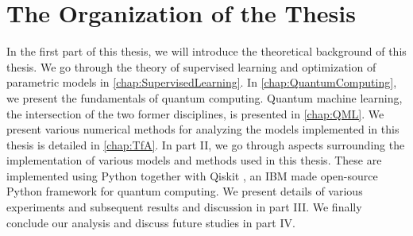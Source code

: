 \section{The Organization of the Thesis}
In the first part of this thesis, we will introduce the theoretical background of this thesis. We go through the theory of supervised learning and optimization of parametric models in \cref{chap:SupervisedLearning}. In \cref{chap:QuantumComputing}, we present the fundamentals of quantum computing. Quantum machine learning, the intersection of the two former disciplines, is presented in \cref{chap:QML}. We present various numerical methods for analyzing the models implemented in this thesis is detailed in \cref{chap:TfA}. In part II, we go through aspects surrounding the implementation of various models and methods used in this thesis. These are implemented using Python together with Qiskit \cite{Qiskit}, an IBM made open-source Python framework for quantum computing. We present details of various experiments and subsequent results and discussion in part III. We finally conclude our analysis and discuss future studies in part IV.

